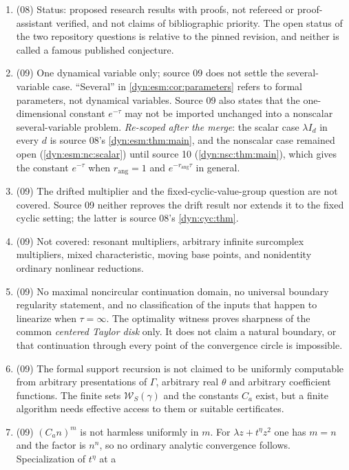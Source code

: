 \documentclass[11pt,letterpaper]{article}
\theoremstyle{definition}
\theoremstyle{remark}
\newcommand{\word}{\mathcal W}
\newcommand{\rang}{r_{\mathrm{ang}}}
\numberwithin{equation}{section}
\begin{document}
\begin{enumerate}[label=\textbf{N\arabic*.},ref=\textbf{N\arabic*},leftmargin=3.2em,start=81]
positivity. The error may contain many terms, and some of them may be large
(\cref{dyn:cyc:rem:excludes}).
\item (08) Status: proposed research results with proofs, not refereed or
proof-assistant verified, and not claims of bibliographic priority. The
open status of the two repository questions is relative to the pinned
revision, and neither is called a famous published conjecture.
\item\label{dyn:esm:nc:onevar} (09) One dynamical variable only; source 09
does not settle the several-variable case. ``Several'' in
\cref{dyn:esm:cor:parameters} refers to formal parameters, not dynamical
variables. Source 09 also states that the one-dimensional constant
$e^{-\tau}$ may not be imported unchanged into a nonscalar several-variable
problem. \emph{Re-scoped after the merge}: the scalar case $\lambda I_d$ in
every $d$ is source 08's \cref{dyn:esm:thm:main}, and the nonscalar case
remained open (\ref{dyn:esm:nc:scalar}) until source 10
(\cref{dyn:nsc:thm:main}), which gives the constant $e^{-\tau}$ when
$\rang=1$ and $e^{-\rang\tau}$ in general.
\item (09) The drifted multiplier and the fixed-cyclic-value-group question
are not covered. Source 09 neither reproves the drift result nor extends it
to the fixed cyclic setting; the latter is source 08's
\cref{dyn:cyc:thm}.
\item (09) Not covered: resonant multipliers, arbitrary infinite surcomplex
multipliers, mixed characteristic, moving base points, and nonidentity
ordinary nonlinear reductions.
\item (09) No maximal noncircular continuation domain, no universal boundary
regularity statement, and no classification of the inputs that happen to
linearize when $\tau=\infty$. The optimality witness proves sharpness of the
common \emph{centered Taylor disk} only. It does not claim a natural
boundary, or that continuation through every point of the convergence circle
is impossible.
\item (09) The formal support recursion is not claimed to be uniformly
computable from arbitrary presentations of $\Gamma$, arbitrary real
$\theta$ and arbitrary coefficient functions. The finite sets
$\word_S(\gamma)$ and the constants $C_a$ exist, but a finite algorithm
needs effective access to them or suitable certificates.
\item (09) $(C_an)^{m}$ is not harmless uniformly in $m$. For
$\lambda z+t^{\eta}z^{2}$ one has $m=n$ and the factor is $n^{n}$, so no
ordinary analytic convergence follows. Specialization of $t^{\eta}$ at a

\end{enumerate}
\end{document}
